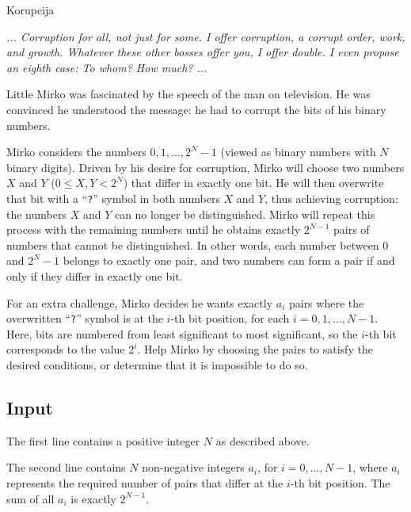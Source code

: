 \begin{statement}[
  problempoints=100,
  timelimit=1 second,
  memorylimit=512 MiB,
]{Korupcija}

\textit{... Corruption for all, not just for some. I offer corruption, a corrupt order, work, and growth. 
Whatever these other bosses offer you, I offer double.
I even propose an eighth case: To whom? How much? ...}

Little Mirko was fascinated by the speech of the man on television.
He was convinced he understood the message: he had to corrupt the bits of his binary numbers.

Mirko considers the numbers $0, 1, \dots, 2^N-1$ (viewed as binary numbers with $N$ binary digits).  
Driven by his desire for corruption, Mirko will choose two numbers $X$ and $Y$ ($0 \leq X, Y < 2^N$) 
that differ in exactly one bit.  
He will then overwrite that bit with a “\texttt{?}” symbol in both numbers $X$ and $Y$, 
thus achieving corruption: the numbers $X$ and $Y$ can no longer be distinguished.  
Mirko will repeat this process with the remaining numbers until he obtains 
exactly $2^{N-1}$ pairs of numbers that cannot be distinguished.  
In other words, each number between $0$ and $2^N-1$ belongs to exactly one pair, and  
two numbers can form a pair if and only if they differ in exactly one bit.

For an extra challenge, Mirko decides he wants exactly $a_i$ pairs 
where the overwritten “\texttt{?}” symbol is at the $i$-th bit position, 
for each $i = 0, 1, \dots, N-1$.  
Here, bits are numbered from least significant to most significant, so the $i$-th bit 
corresponds to the value $2^i$.  
Help Mirko by choosing the pairs to satisfy the desired conditions, or determine 
that it is impossible to do so.

\subsection*{Input}

The first line contains a positive integer $N$ as described above.

The second line contains $N$ non-negative integers $a_i$, for $i = 0, \dots, N-1$,  
where $a_i$ represents the required number of pairs that differ at the $i$-th bit position.  
The sum of all $a_i$ is exactly $2^{N-1}$.


\end{statement}
